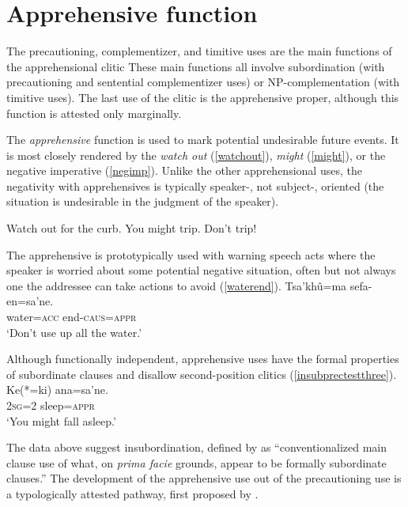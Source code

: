 \documentclass[output=paper,colorlinks,citecolor=brown]{langscibook}
\begin{document}
\section{Apprehensive function} \label{sec:monoclausaluses}

The precautioning, complementizer, and timitive uses are the main functions of the apprehensional clitic \sane[.] These main functions all involve subordination (with precautioning and sentential complementizer uses) or NP-com\-ple\-men\-ta\-tion (with timitive uses). The last use of the   clitic is the apprehensive proper, although this function is attested only marginally.

The \emph{apprehensive} function is used to mark potential undesirable future events. It is most closely rendered by the  \emph{watch out} (\ref{watchout}), \emph{might} (\ref{might}), or the negative imperative (\ref{negimp}). Unlike the other apprehensional uses, the negativity with apprehensives is typically speaker-, not subject-, oriented (the situation is undesirable in the judgment of the speaker). 


\begin{exe}
    \ex \label{watchout}
     Watch out for the curb.
    \ex \label{might}
    You might trip.
    \ex \label{negimp}
     Don't trip!
\end{exe}

The apprehensive is prototypically used with warning speech acts where the speaker is worried about some potential negative situation, often but not always one the addressee can take actions to avoid (\ref{waterend}).
    \ea \label{waterend}
    \gll {\ob}Tsa'khû=ma sefa-en{\cb}=sa'ne. \\
    water=\textsc{acc} {end-\textsc{caus=appr}} \\
    \glt `Don't use up all the water.'
    \hfill \citep[p. 37]{borman1990lessons}
    \z

Although functionally independent, apprehensive uses have the formal properties of subordinate clauses and disallow second-position clitics (\ref{insubprectestthree}).
    \ea \label{insubprectestthree}
    \gll {\ob}Ke{\rm(*}=ki{\rm)} ana=sa'ne.{\cb} \\
         \textsc{2sg=2} sleep=\textsc{appr}\\
    \glt `You might fall asleep.'
    \z

The data above suggest insubordination, defined by \citet[367]{evans2007insubordination} as ``conventionalized main clause use of what, on \emph{prima facie} grounds, appear to be formally subordinate clauses.'' The development of the apprehensive use out of the precautioning use is a typologically attested pathway, first proposed by \citet{lichtenberk1995apprehensional}. 
\end{document}
